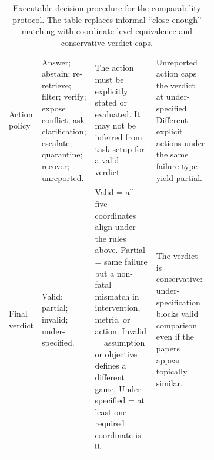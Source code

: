 \documentclass[11pt]{article}
\begin{document}
\begin{table}[t]
\begin{tabularx}{\linewidth}{>{\raggedright\arraybackslash}p{0.13\linewidth}>{\raggedright\arraybackslash}p{0.26\linewidth}>{\raggedright\arraybackslash}p{0.30\linewidth}X}
Action policy & Answer; abstain; re-retrieve; filter; verify; expose conflict; ask clarification; escalate; quarantine; recover; unreported. & The action must be explicitly stated or evaluated. It may not be inferred from task setup for a valid verdict. & Unreported action caps the verdict at under-specified. Different explicit actions under the same failure type yield partial. \\
Final verdict & Valid; partial; invalid; under-specified. & Valid = all five coordinates align under the rules above. Partial = same failure but a non-fatal mismatch in intervention, metric, or action. Invalid = assumption or objective defines a different game. Under-specified = at least one required coordinate is \texttt{U}. & The verdict is conservative: under-specification blocks valid comparison even if the papers appear topically similar. \\
\bottomrule
\end{tabularx}
\caption{Executable decision procedure for the comparability protocol. The table replaces informal ``close enough'' matching with coordinate-level equivalence and conservative verdict caps.}
\label{tab:framework-decision-procedure}
\end{table}

\end{document}
